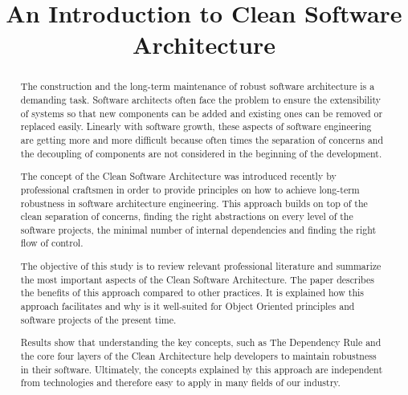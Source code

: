 \documentclass[conference]{IEEEtran}
\begin{document}
\title{An Introduction to Clean Software Architecture}

\author{
}

\maketitle

\begin{abstract}
The construction and the long-term maintenance of robust software architecture is a demanding task. Software architects often face the problem to ensure the extensibility of systems so that new components can be added and existing ones can be removed or replaced easily. Linearly with software growth, these aspects of software engineering are getting more and more difficult because often times the separation of concerns and the decoupling of components are not considered in the beginning of the development.

The concept of the Clean Software Architecture was introduced recently by professional craftsmen in order to provide principles on how to achieve long-term robustness in software architecture engineering. This approach builds on top of the clean separation of concerns, finding the right abstractions on every level of the software projects, the minimal number of internal dependencies and finding the right flow of control.

The objective of this study is to review relevant professional literature and summarize the most important aspects of the Clean Software Architecture. The paper describes the benefits of this approach compared to other practices. It is explained how this approach facilitates and why is it well-suited for Object Oriented principles and software projects of the present time. 

Results show that understanding the key concepts, such as The Dependency Rule and the core four layers of the Clean Architecture help developers to maintain robustness in their software. Ultimately, the concepts explained by this approach are independent from technologies and therefore easy to apply in many fields of our industry. 
\end{abstract}
\end{document}
